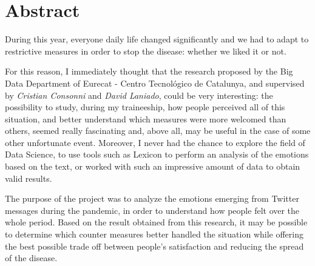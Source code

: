 
\chapter*{Abstract} %
\label{abstract}  


During this year, everyone daily life changed significantly and we had to adapt to restrictive measures in order to stop the disease: whether we liked it or not. 

For this reason, I immediately thought that the research proposed by the Big Data Department of Eurecat - Centro Tecnológico de Catalunya, and supervised by \textit{Cristian Consonni} and \textit{David Laniado}, could be very interesting: the possibility to study, during my traineeship, how people perceived all of this situation, and better understand which measures were more welcomed than others, seemed really fascinating and, above all, may be useful in the case of some other unfortunate event. Moreover, I never had the chance to explore the field of Data Science, to use tools such as Lexicon to perform an analysis of the emotions based on the text, or worked with such an impressive amount of data to obtain valid results.

The purpose of the project was to analyze the emotions emerging from Twitter messages during the pandemic, in order to understand how people felt over the whole period. Based on the result obtained from this research, it may be possible to determine which counter measures better handled the situation while offering the best possible trade off between people's satisfaction and reducing the spread of the disease.

